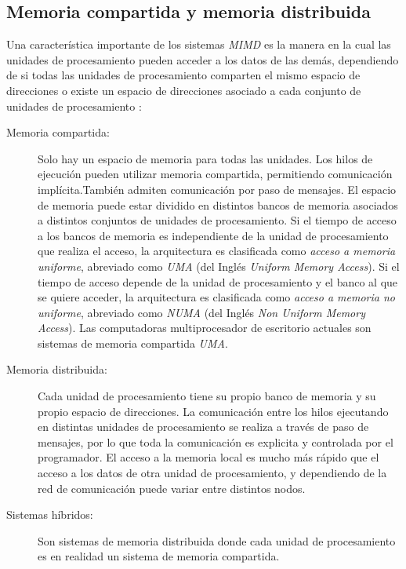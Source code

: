 \subsection{Memoria compartida y memoria distribuida}

Una característica importante de los sistemas \emph{MIMD} es la manera en la
cual las unidades de procesamiento pueden acceder a los datos de las demás,
dependiendo de si todas las unidades de procesamiento comparten el mismo espacio
de direcciones o existe un espacio de direcciones asociado a cada conjunto de
unidades de procesamiento \cite{introToPC2002, anIntroToPP2011}:

\begin{description}

	\item[Memoria compartida:] Solo hay un espacio de memoria para todas las
		unidades. Los hilos de ejecución pueden utilizar memoria
		compartida, permitiendo comunicación implícita.También admiten
		comunicación por paso de mensajes. El espacio de memoria puede
		estar dividido en distintos bancos de memoria asociados a
		distintos conjuntos de unidades de procesamiento. Si el tiempo
		de acceso a los bancos de memoria es independiente de la unidad
		de procesamiento que realiza el acceso, la arquitectura es
		clasificada como \emph{acceso a memoria uniforme}, abreviado
		como \emph{UMA} (del Inglés \emph{Uniform Memory Access}). Si el
		tiempo de acceso depende de la unidad de procesamiento y el
		banco al que se quiere acceder, la arquitectura es clasificada
		como \emph{acceso a memoria no uniforme}, abreviado como
		\emph{NUMA} (del Inglés \emph{Non Uniform Memory Access}). Las
		computadoras multiprocesador de escritorio actuales son sistemas
		de memoria compartida \emph{UMA}.

	\item[Memoria distribuida:] Cada unidad de procesamiento tiene su propio
		banco de memoria y su propio espacio de direcciones. La
		comunicación entre los hilos ejecutando en distintas unidades de
		procesamiento se realiza a través de paso de mensajes, por lo
		que toda la comunicación es explicita y controlada por el
		programador. El acceso a la memoria local es mucho más rápido
		que el acceso a los datos de otra unidad de procesamiento, y
		dependiendo de la red de comunicación puede variar entre
		distintos nodos.

	\item[Sistemas híbridos:] Son sistemas de memoria distribuida donde
		cada unidad de procesamiento es en realidad un sistema de
		memoria compartida.

\end{description}
